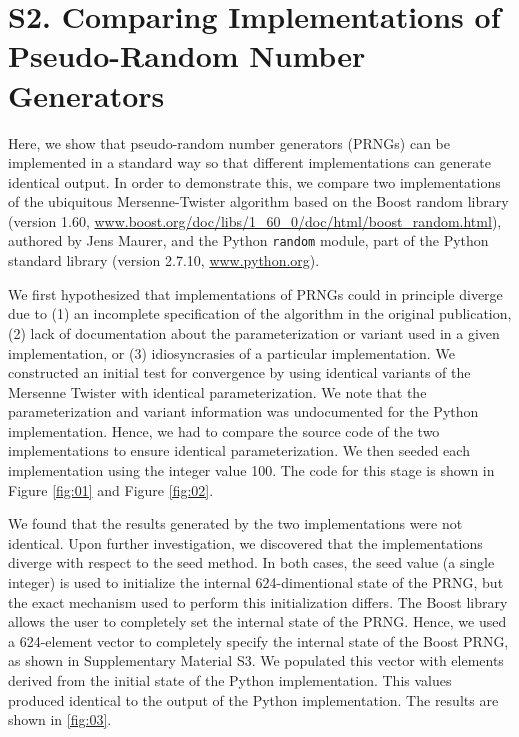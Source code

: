 \documentclass{article}
\begin{document}
\section*{S2. Comparing Implementations of Pseudo-Random Number Generators}

Here, we show that pseudo-random number generators (PRNGs) can be implemented in a standard way so that different implementations can generate identical output. In order to demonstrate this, we compare two implementations of the ubiquitous Mersenne-Twister algorithm \cite{matsumoto1998mersenne} based on the Boost random library (version 1.60, \href{www.boost.org/doc/libs/1\_60\_0/doc/html/boost\_random.html}{www.boost.org/doc/libs/1\_60\_0/doc/html/boost\_random.html}), authored by Jens Maurer, and the Python \verb|random| module, part of the Python standard library (version 2.7.10, \href{www.python.org}{www.python.org}).

We first hypothesized that implementations of PRNGs could in principle diverge due to (1) an incomplete specification of the algorithm in the original publication, (2) lack of documentation about the parameterization or variant used in a given implementation, or (3) idiosyncrasies of a particular implementation. We constructed an initial test for convergence by using identical variants of the Mersenne Twister with identical parameterization. We note that the parameterization and variant information was undocumented for the Python implementation. Hence, we had to compare the source code of the two implementations to ensure identical parameterization. We then seeded each implementation using the integer value 100. The code for this stage is shown in Figure \ref{fig:01} and Figure \ref{fig:02}.

We found that the results generated by the two implementations were not identical. Upon further investigation, we discovered that the implementations diverge with respect to the seed method. In both cases, the seed value (a single integer) is used to initialize the internal 624-dimentional state of the PRNG, but the exact mechanism used to perform this initialization differs. The Boost library allows the user to completely set the internal state of the PRNG. Hence, we used a 624-element vector to completely specify the internal state of the Boost PRNG, as shown in Supplementary Material S3. We populated this vector with elements derived from the initial state of the Python implementation. This values produced identical to the output of the Python implementation. The results are shown in \ref{fig:03}.
\end{document}
